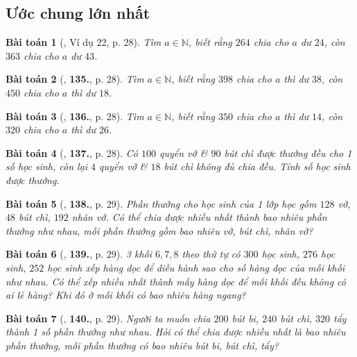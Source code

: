 \documentclass{article}
\numberwithin{equation}{section}
\newtheorem{baitoan}{Bài toán}[section]
\begin{document}
\subsection{Ước chung lớn nhất}
\begin{baitoan}[\cite{Binh_Toan_6_tap_1}, Ví dụ 22, p. 28]
	Tìm $a\in\mathbb{N}$, biết rằng $264$ chia cho $a$ dư $24$, còn $363$ chia cho $a$ dư $43$.
\end{baitoan}

\begin{baitoan}[\cite{Binh_Toan_6_tap_1}, \textbf{135.}, p. 28]
	Tìm $a\in\mathbb{N}$, biết rằng $398$ chia cho $a$ thì dư $38$, còn $450$ chia cho $a$ thì dư $18$.
\end{baitoan}

\begin{baitoan}[\cite{Binh_Toan_6_tap_1}, \textbf{136.}, p. 28]
	Tìm $a\in\mathbb{N}$, biết rằng $350$ chia cho $a$ thì dư $14$, còn $320$ chia cho $a$ thì dư $26$.
\end{baitoan}

\begin{baitoan}[\cite{Binh_Toan_6_tap_1}, \textbf{137.}, p. 28]
	Có $100$ quyển vở \& $90$ bút chì được thưởng đều cho 1 số học sinh, còn lại $4$ quyển vở \& $18$ bút chì không đủ chia đều. Tính số học sinh được thưởng.
\end{baitoan}

\begin{baitoan}[\cite{Binh_Toan_6_tap_1}, \textbf{138.}, p. 29]
	Phần thưởng cho học sinh của 1 lớp học gồm $128$ vở, $48$ bút chì, $192$ nhãn vở. Có thể chia được nhiều nhất thành bao nhiêu phần thưởng như nhau, mỗi phần thưởng gồm bao nhiêu vở, bút chì, nhãn vở?
\end{baitoan}

\begin{baitoan}[\cite{Binh_Toan_6_tap_1}, \textbf{139.}, p. 29]
	3 khối $6,7,8$ theo thứ tự có $300$ học sinh, $276$ học sinh, $252$ học sinh xếp hàng dọc để diễu hành sao cho số hàng dọc của mỗi khối như nhau. Có thể xếp nhiều nhất thành mấy hàng dọc để mỗi khối đều không có ai lẻ hàng? Khi đó ở mỗi khối có bao nhiêu hàng ngang?
\end{baitoan}

\begin{baitoan}[\cite{Binh_Toan_6_tap_1}, \textbf{140.}, p. 29]
	Người ta muốn chia $200$ bút bi, $240$ bút chì, $320$ tẩy thành 1 số phần thưởng như nhau. Hỏi có thể chia được nhiều nhất là bao nhiêu phần thưởng, mỗi phần thưởng có bao nhiêu bút bi, bút chì, tẩy?
\end{baitoan}
\end{document}
